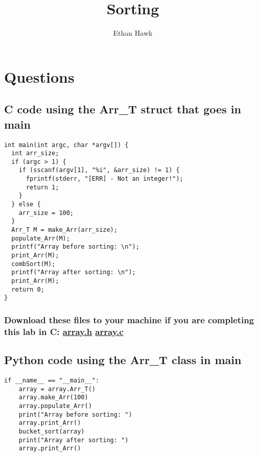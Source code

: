 \documentclass{article}
\title{Sorting}
\author{Ethan Hawk}
\begin{document}
\maketitle

\section*{Questions}

\subsection{C code using the Arr\_T struct that goes in main}
\begin{lstlisting}
int main(int argc, char *argv[]) {
  int arr_size;
  if (argc > 1) {
    if (sscanf(argv[1], "%i", &arr_size) != 1) {
      fprintf(stderr, "[ERR] - Not an integer!");
      return 1;
    }
  } else {
    arr_size = 100;
  }
  Arr_T M = make_Arr(arr_size);
  populate_Arr(M);
  printf("Array before sorting: \n");
  print_Arr(M);
  combSort(M);
  printf("Array after sorting: \n");
  print_Arr(M);
  return 0;
}
\end{lstlisting}

\subsubsection{Download these files to your machine if you are completing this lab in C:
\href{https://github.com/ehawkvu/ds-n-a/blob/master/sorting/c/array.h}{array.h} \href{https://github.com/ehawkvu/ds-n-a/blob/master/sorting/c/array.c}{array.c}}


\pagebreak{}

\subsection{Python code using the Arr\_T class in main}
\begin{lstlisting}
if __name__ == "__main__":
    array = array.Arr_T()
    array.make_Arr(100)
    array.populate_Arr()
    print("Array before sorting: ")
    array.print_Arr()
    bucket_sort(array)
    print("Array after sorting: ")
    array.print_Arr()
\end{lstlisting}
\end{document}

